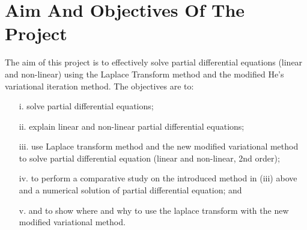 \documentclass[12pt]{report}
\begin{document}
\section{Aim And Objectives Of The Project}
\qquad The aim of this project is to effectively solve partial differential equations (linear and non-linear) using the Laplace Transform method and the modified He's variational iteration method. The objectives are to:
\begin{enumerate}
	\item[i.] solve partial differential equations;
  \item[ii.] explain linear and non-linear partial differential equations;
  \item[iii.] use Laplace transform method and the new modified variational method to solve partial differential equation (linear and non-linear, 2nd order);
	\item[iv.] to perform a comparative study on the introduced method  in (iii) above and a numerical solution of partial differential equation; and
	\item[v.] and to show where and why to use the laplace transform with the new modified variational method.
\end{enumerate}
\end{document}
